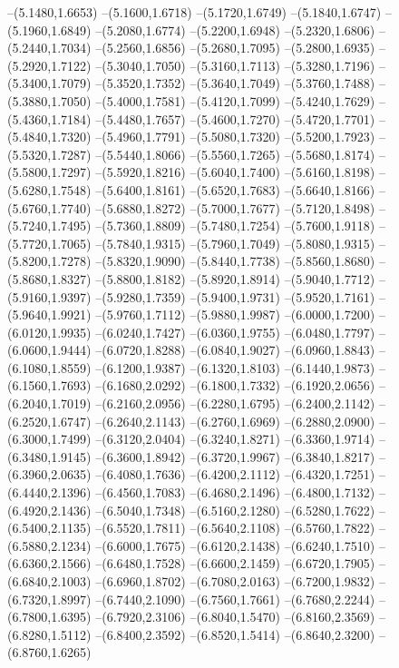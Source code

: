 {\begin{scope}
--(5.1480,1.6653)
--(5.1600,1.6718)
--(5.1720,1.6749)
--(5.1840,1.6747)
--(5.1960,1.6849)
--(5.2080,1.6774)
--(5.2200,1.6948)
--(5.2320,1.6806)
--(5.2440,1.7034)
--(5.2560,1.6856)
--(5.2680,1.7095)
--(5.2800,1.6935)
--(5.2920,1.7122)
--(5.3040,1.7050)
--(5.3160,1.7113)
--(5.3280,1.7196)
--(5.3400,1.7079)
--(5.3520,1.7352)
--(5.3640,1.7049)
--(5.3760,1.7488)
--(5.3880,1.7050)
--(5.4000,1.7581)
--(5.4120,1.7099)
--(5.4240,1.7629)
--(5.4360,1.7184)
--(5.4480,1.7657)
--(5.4600,1.7270)
--(5.4720,1.7701)
--(5.4840,1.7320)
--(5.4960,1.7791)
--(5.5080,1.7320)
--(5.5200,1.7923)
--(5.5320,1.7287)
--(5.5440,1.8066)
--(5.5560,1.7265)
--(5.5680,1.8174)
--(5.5800,1.7297)
--(5.5920,1.8216)
--(5.6040,1.7400)
--(5.6160,1.8198)
--(5.6280,1.7548)
--(5.6400,1.8161)
--(5.6520,1.7683)
--(5.6640,1.8166)
--(5.6760,1.7740)
--(5.6880,1.8272)
--(5.7000,1.7677)
--(5.7120,1.8498)
--(5.7240,1.7495)
--(5.7360,1.8809)
--(5.7480,1.7254)
--(5.7600,1.9118)
--(5.7720,1.7065)
--(5.7840,1.9315)
--(5.7960,1.7049)
--(5.8080,1.9315)
--(5.8200,1.7278)
--(5.8320,1.9090)
--(5.8440,1.7738)
--(5.8560,1.8680)
--(5.8680,1.8327)
--(5.8800,1.8182)
--(5.8920,1.8914)
--(5.9040,1.7712)
--(5.9160,1.9397)
--(5.9280,1.7359)
--(5.9400,1.9731)
--(5.9520,1.7161)
--(5.9640,1.9921)
--(5.9760,1.7112)
--(5.9880,1.9987)
--(6.0000,1.7200)
--(6.0120,1.9935)
--(6.0240,1.7427)
--(6.0360,1.9755)
--(6.0480,1.7797)
--(6.0600,1.9444)
--(6.0720,1.8288)
--(6.0840,1.9027)
--(6.0960,1.8843)
--(6.1080,1.8559)
--(6.1200,1.9387)
--(6.1320,1.8103)
--(6.1440,1.9873)
--(6.1560,1.7693)
--(6.1680,2.0292)
--(6.1800,1.7332)
--(6.1920,2.0656)
--(6.2040,1.7019)
--(6.2160,2.0956)
--(6.2280,1.6795)
--(6.2400,2.1142)
--(6.2520,1.6747)
--(6.2640,2.1143)
--(6.2760,1.6969)
--(6.2880,2.0900)
--(6.3000,1.7499)
--(6.3120,2.0404)
--(6.3240,1.8271)
--(6.3360,1.9714)
--(6.3480,1.9145)
--(6.3600,1.8942)
--(6.3720,1.9967)
--(6.3840,1.8217)
--(6.3960,2.0635)
--(6.4080,1.7636)
--(6.4200,2.1112)
--(6.4320,1.7251)
--(6.4440,2.1396)
--(6.4560,1.7083)
--(6.4680,2.1496)
--(6.4800,1.7132)
--(6.4920,2.1436)
--(6.5040,1.7348)
--(6.5160,2.1280)
--(6.5280,1.7622)
--(6.5400,2.1135)
--(6.5520,1.7811)
--(6.5640,2.1108)
--(6.5760,1.7822)
--(6.5880,2.1234)
--(6.6000,1.7675)
--(6.6120,2.1438)
--(6.6240,1.7510)
--(6.6360,2.1566)
--(6.6480,1.7528)
--(6.6600,2.1459)
--(6.6720,1.7905)
--(6.6840,2.1003)
--(6.6960,1.8702)
--(6.7080,2.0163)
--(6.7200,1.9832)
--(6.7320,1.8997)
--(6.7440,2.1090)
--(6.7560,1.7661)
--(6.7680,2.2244)
--(6.7800,1.6395)
--(6.7920,2.3106)
--(6.8040,1.5470)
--(6.8160,2.3569)
--(6.8280,1.5112)
--(6.8400,2.3592)
--(6.8520,1.5414)
--(6.8640,2.3200)
--(6.8760,1.6265)

\end{scope}}

